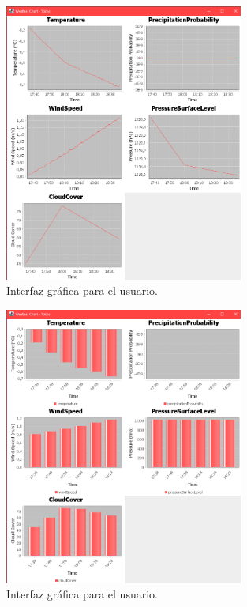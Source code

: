 \documentclass{article}
\begin{document}
\begin{figure}[H]
  \centering
  \includegraphics[width=0.7\textwidth]{images/image4.png}
  \caption{Interfaz gráfica para el usuario.}
  \label{fig:seleccion_ciudad3}
\end{figure}

\begin{figure}[H]
  \centering
  \includegraphics[width=0.7\textwidth]{images/image10.png}
  \caption{Interfaz gráfica para el usuario.}
  \label{fig:seleccion_ciudad4}
\end{figure}
\end{document}
